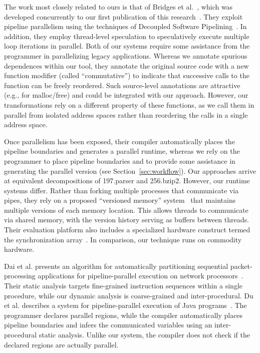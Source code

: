 The work most closely related to ours is that of Bridges et
al.~\cite{bridges07revisiting}, which was developed concurrently to
our first publication of this research~\cite{thies-micro07}.  They
exploit pipeline parallelism using the techniques of Decoupled
Software Pipelining~\cite{rangan04array,ottoni05decoupled}.  In
addition, they employ thread-level speculation to speculatively
execute multiple loop iterations in parallel.  Both of our systems
require some assistance from the programmer in parallelizing legacy
applications.  Whereas we annotate spurious dependences within our
tool, they annotate the original source code with a new function
modifier (called ``commutative'') to indicate that successive calls to
the function can be freely reordered.  Such source-level annotations
are attractive (e.g., for malloc/free) and could be integrated with
our approach.  However, our transformations rely on a different
property of these functions, as we call them in parallel from isolated
address spaces rather than reordering the calls in a single address
space.

Once parallelism has been exposed, their compiler automatically places
the pipeline boundaries and generates a parallel runtime, whereas we
rely on the programmer to place pipeline boundaries and to provide
some assistance in generating the parallel version (see
Section~\ref{sec:workflow}).  Our approaches arrive at equivalent
decompositions of 197.parser and 256.bzip2.  However, our runtime
systems differ.  Rather than forking multiple processes that
communicate via pipes, they rely on a proposed ``versioned memory''
system~\cite{vachharajani07speculation} that maintains multiple
versions of each memory location.  This allows threads to communicate
via shared memory, with the version history serving as buffers between
threads.  Their evaluation platform also includes a specialized
hardware construct termed the synchronization
array~\cite{rangan04array}.  In comparison, our technique runs on
commodity hardware.

Dai et al. presents an algorithm for automatically partitioning
sequential packet-processing applications for pipeline-parallel
execution on network processors~\cite{dai05packet}.  
Their static analysis targets fine-grained instruction sequences
within a single procedure, while our dynamic analysis is
coarse-grained and inter-procedural.  Du et al. describes a system for
pipeline-parallel execution of Java programs~\cite{du03sc}.  The
programmer declares parallel regions, while the compiler automatically
places pipeline boundaries and infers the communicated variables using
an inter-procedural static analysis.  Unlike our system, the compiler
does not check if the declared regions are actually parallel.

